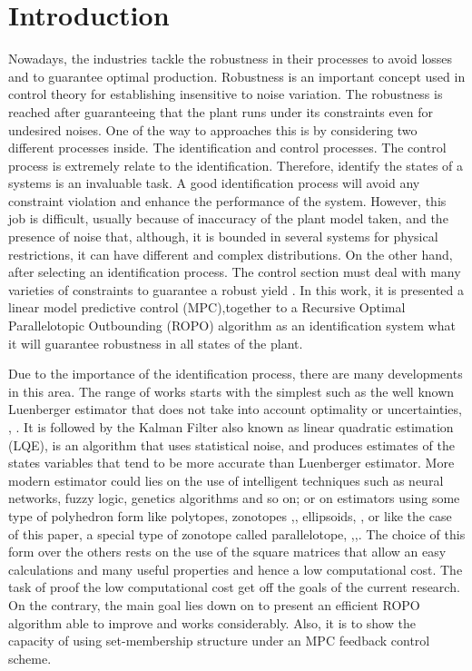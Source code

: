 \documentclass{ifacconf}
\begin{document}
\section{Introduction}
Nowadays, the industries tackle the robustness in their processes to avoid losses and to guarantee optimal production. Robustness is an important concept used in control theory for establishing insensitive to noise variation. The robustness is reached after guaranteeing that the plant runs under its constraints even for undesired noises. One of the way to approaches this is by considering two different processes inside. The identification and control processes. The control process is extremely relate to the identification. Therefore, identify the states of a systems is an invaluable task. A good identification process will avoid any constraint violation and enhance the performance of the system. However, this job is difficult, usually because of inaccuracy of the plant model taken, and the presence of noise that, although, it is bounded in several systems for physical restrictions, it can have different and complex distributions. On the other hand, after selecting an identification process. The control section must deal with many varieties of constraints to guarantee a robust yield \citep{maciejowski2002}. In this work, it is presented a linear model predictive control (MPC),together to a Recursive Optimal Parallelotopic Outbounding (ROPO) algorithm as an identification system what it will guarantee robustness in all states of the plant.

Due to the importance of the identification process, there are many developments in this area. The range of works starts with the simplest such as the well known Luenberger estimator that does not take into account optimality or uncertainties, \citep{dorf2011modern}, \citep{Zonotopes_text}. It is followed by the Kalman Filter also known as linear quadratic estimation (LQE), is an algorithm that uses statistical noise, and produces estimates of the states variables that tend to be more accurate than Luenberger estimator. More modern   estimator could lies on the use of intelligent techniques such as neural networks, fuzzy logic, genetics algorithms and so on; or on estimators using some type of polyhedron form like polytopes, zonotopes \citep{Comb2003},\citep{sco14},\citep{Zonotopes_text} ellipsoids, \citep{Filippova1996}, \citep{kur97} or like the case of this paper, a special type of zonotope called parallelotope, \citep{Zappa1996},\citep{Chisci1996},\citep{udit2018}. The choice of this form over the others rests on the use of the square matrices that allow an easy calculations and many useful properties and hence a low computational cost. The task of proof the low computational cost get off the goals of the current research. On the contrary, the main goal lies down on to present an efficient ROPO algorithm able to improve \citep{Zappa1996} and \citep{udit2018} works considerably. Also, it is to show the capacity of using set-membership structure under an MPC feedback control scheme.
\end{document}
